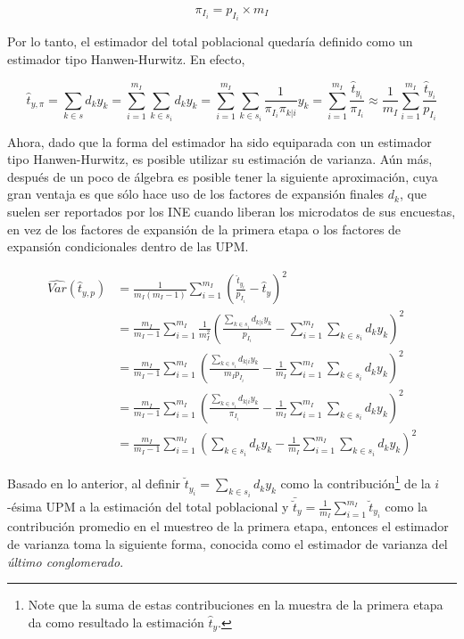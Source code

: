 \documentclass[
  12pt,
]{book}
\begin{document}
\[
\pi_{I_i} = p_{I_i} \times m_I 
\]

Por lo tanto, el estimador del total poblacional quedaría definido como un estimador tipo Hanwen-Hurwitz. En efecto,

\[
\hat{t}_{y,\pi} =\sum_{k\in s} d_k y_k  
= \sum_{i=1}^{m_I}\sum_{k \in s_i} d_k y_k 
= \sum_{i=1}^{m_I}\sum_{k \in s_i} \frac{1}{\pi_{I_i} \pi_{k|i}} y_k 
= \sum_{i=1}^{m_I}\frac{\hat{t}_{y_i}}{\pi_{I_i}} 
\approx \frac{1}{m_I}\sum_{i=1}^{m_I}\frac{\hat{t}_{y_i}}{p_{I_i}}
\]

Ahora, dado que la forma del estimador ha sido equiparada con un estimador tipo Hanwen-Hurwitz, es posible utilizar su estimación de varianza. Aún más, después de un poco de álgebra es posible tener la siguiente aproximación, cuya gran ventaja es que sólo hace uso de los factores de expansión finales \(d_k\), que suelen ser reportados por los INE cuando liberan los microdatos de sus encuestas, en vez de los factores de expansión de la primera etapa o los factores de expansión condicionales dentro de las UPM.

\begin{align*}
\widehat{Var}(\hat{t}_{y,p})&=\frac{1}{m_I(m_I-1)}\sum_{i=1}^{m_I}\left(\frac{\hat{t}_{y_i}}{p_{I_i}}-\hat{t}_{y}\right)^2\\
&=\frac{m_I}{m_I-1}\sum_{i=1}^{m_I}\frac{1}{m_I^2}\left(\frac{\sum_{k \in s_i} d_{k|i} y_k }{p_{I_i}}-\sum_{i=1}^{m_I}\sum_{k \in s_i} d_k y_k \right)^2 \\
&=\frac{m_I}{m_I-1}\sum_{i=1}^{m_I}\left(\frac{\sum_{k \in s_i} d_{k|i} y_k }{m_I p_{I_i}}-\frac{1}{m_I}\sum_{i=1}^{m_I}\sum_{k \in s_i} d_k y_k \right)^2 \\
&=\frac{m_I}{m_I-1}\sum_{i=1}^{m_I}\left(\frac{\sum_{k \in s_i} d_{k|i} y_k }{\pi_{I_i}}-\frac{1}{m_I}\sum_{i=1}^{m_I}\sum_{k \in s_i} d_k y_k \right)^2 \\
&=\frac{m_I}{m_I-1}\sum_{i=1}^{m_I}\left( \sum_{k \in s_i} d_k y_k -\frac{1}{m_I}\sum_{i=1}^{m_I}\sum_{k \in s_i} d_k y_k \right)^2 
\end{align*}

Basado en lo anterior, al definir \(\breve{t}_{y_i} = \sum_{k \in s_i} d_k y_k\) como la contribución\footnote{Note que la suma de estas contribuciones en la muestra de la primera etapa da como resultado la estimación \(\hat{t}_y\).} de la \(i\)-ésima UPM a la estimación del total poblacional y \(\bar{\breve{t}}_{y}=\frac{1}{m_I}\sum_{i=1}^{m_I}\breve{t}_{y_i}\) como la contribución promedio en el muestreo de la primera etapa, entonces el estimador de varianza toma la siguiente forma, conocida como el estimador de varianza del \emph{último conglomerado}.
\end{document}

